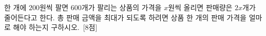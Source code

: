 한 개에 $200$원씩 팔면 $600$개가 팔리는 상품의 가격을 $x$원씩 올리면 판매량은 $2x$개가 줄어든다고 한다. 총 판매 금액을 최대가 되도록 하려면 상품 한 개의 판매 가격을 얼마로 해야 하는지 구하시오.~\mbox{\mbox{[8점]}}
